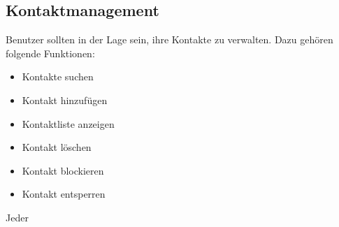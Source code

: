 \subsection{Kontaktmanagement}

Benutzer sollten in der Lage sein, ihre Kontakte zu verwalten. Dazu gehören folgende Funktionen:

\begin{itemize}
    \item Kontakte suchen
    \item Kontakt hinzufügen
    \item Kontaktliste anzeigen
    \item Kontakt löschen
    \item Kontakt blockieren
    \item Kontakt entsperren
\end{itemize}

\noindent Jeder 
